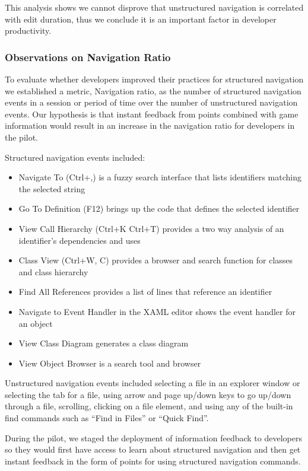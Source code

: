 \documentclass{sig-alternate}
\begin{document}
This analysis shows we cannot disprove that unstructured navigation is correlated with edit duration, thus we conclude it is an important factor in developer productivity.  

\subsubsection{Observations on Navigation Ratio}

To evaluate whether developers improved their practices for structured navigation we established a metric, Navigation ratio, as the number of structured navigation events in a session or period of time over the number of unstructured navigation events.  Our hypothesis is that instant feedback from points combined with game information would result in an increase in the navigation ratio for developers in the pilot.

Structured navigation events included: 
\begin{itemize}[itemsep=0mm]
\item Navigate To (Ctrl+,) is a fuzzy search interface that lists identifiers matching the selected string 
\item Go To Definition (F12) brings up the code that defines the selected identifier 
\item View Call Hierarchy (Ctrl+K Ctrl+T) provides a two way analysis of an identifier's dependencies and uses
\item Class View (Ctrl+W, C) provides a browser and search function for classes and class hierarchy
\item Find All References provides a list of lines that reference an identifier
\item Navigate to Event Handler in the XAML editor shows the event handler for an object
\item View Class Diagram generates a class diagram 
\item View Object Browser is a search tool and browser
\end{itemize}

Unstructured navigation events included selecting a file in an explorer window or selecting the tab for a file, using arrow and page up/down keys to go up/down through a file, scrolling, clicking on a file element, and using any of the built-in find commands such as ``Find in Files'' or ``Quick Find''.

During the pilot, we staged the deployment of information feedback to developers so they would first have access to learn about structured navigation and then get instant feedback in the form of points for using structured navigation commands.  
\end{document}
